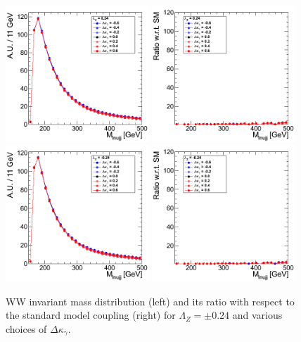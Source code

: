 \begin{figure}[h!t]
  {\centering
    \includegraphics[width=0.48\textwidth]{figs/Mass4Body_024.png}
    \includegraphics[width=0.48\textwidth]{figs/Mass4Body_024_ratio.png}
    \includegraphics[width=0.48\textwidth]{figs/Mass4Body_m024.png}
    \includegraphics[width=0.48\textwidth]{figs/Mass4Body_m024_ratio.png}
    \caption{WW invariant mass distribution (left) and its ratio with respect to 
    the standard model coupling (right) for $\Lambda_Z = \pm 0.24$ and various choices of $\Delta{\kappa_\gamma}$.}
    \label{fig:ww_Mass4Body_atgcRatio024}}
\end{figure}
